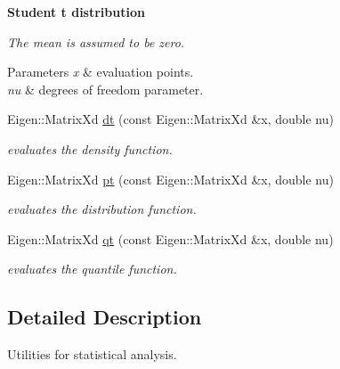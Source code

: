 \begin{Indent}{\bf Student t distribution}\par
{\em The mean is assumed to be zero. 
\begin{DoxyParams}{Parameters}
{\em x} & evaluation points. \\
\hline
{\em nu} & degrees of freedom parameter. \\
\hline
\end{DoxyParams}
}\begin{DoxyCompactItemize}
\item 
Eigen\+::\+Matrix\+Xd \hyperlink{namespacevinecopulib_1_1tools__stats_abc09bc02add2d7b7781aa42a406be7d9}{dt} (const Eigen\+::\+Matrix\+Xd \&x, double nu)\hypertarget{namespacevinecopulib_1_1tools__stats_abc09bc02add2d7b7781aa42a406be7d9}{}\label{namespacevinecopulib_1_1tools__stats_abc09bc02add2d7b7781aa42a406be7d9}

\begin{DoxyCompactList}\small\item\em evaluates the density function. \end{DoxyCompactList}\item 
Eigen\+::\+Matrix\+Xd \hyperlink{namespacevinecopulib_1_1tools__stats_a1f65dc25a8284fe4629f092969e2861a}{pt} (const Eigen\+::\+Matrix\+Xd \&x, double nu)\hypertarget{namespacevinecopulib_1_1tools__stats_a1f65dc25a8284fe4629f092969e2861a}{}\label{namespacevinecopulib_1_1tools__stats_a1f65dc25a8284fe4629f092969e2861a}

\begin{DoxyCompactList}\small\item\em evaluates the distribution function. \end{DoxyCompactList}\item 
Eigen\+::\+Matrix\+Xd \hyperlink{namespacevinecopulib_1_1tools__stats_a17eb427c3a562c72d2e87438da1cd279}{qt} (const Eigen\+::\+Matrix\+Xd \&x, double nu)\hypertarget{namespacevinecopulib_1_1tools__stats_a17eb427c3a562c72d2e87438da1cd279}{}\label{namespacevinecopulib_1_1tools__stats_a17eb427c3a562c72d2e87438da1cd279}

\begin{DoxyCompactList}\small\item\em evaluates the quantile function. \end{DoxyCompactList}\end{DoxyCompactItemize}
\end{Indent}


\subsection{Detailed Description}
Utilities for statistical analysis. 

